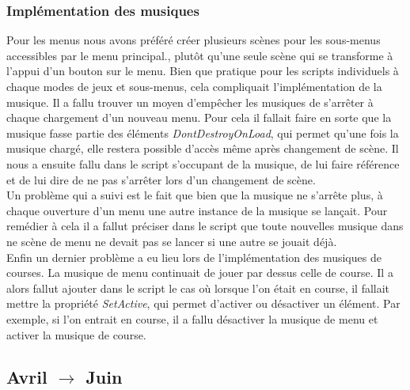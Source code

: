 \documentclass[a4paper,12pt]{article}
\begin{document}
            \subsubsection{Implémentation des musiques}
                Pour les menus nous avons préféré créer plusieurs scènes pour les sous-menus accessibles
                par le menu principal., plutôt qu'une seule scène qui se transforme à l'appui d'un 
                bouton sur le menu.
                Bien que pratique pour les scripts individuels à chaque modes de jeux et sous-menus,
                cela compliquait l'implémentation de la musique. Il a fallu trouver un moyen d'empêcher
                les musiques de s'arrêter à chaque chargement d'un nouveau menu. Pour cela il
                fallait faire en sorte que la musique fasse partie des éléments
                \textit{DontDestroyOnLoad}, qui permet qu'une fois la musique chargé, elle restera 
                possible d'accès
                même après changement de scène. Il nous a ensuite fallu dans le script s'occupant de la 
                musique, de lui faire référence et de lui dire de ne pas s'arrêter lors d'un changement
                de scène.\\
                Un problème qui a suivi est le fait que bien que la musique ne s'arrête plus, à chaque
                ouverture d'un menu une autre instance de la musique se lançait. Pour remédier à cela il
                a fallut préciser dans le script que toute nouvelles musique dans ne scène de menu ne
                devait pas se lancer si une autre se jouait déjà.\\
                Enfin un dernier problème a eu lieu lors de l'implémentation des musiques de courses. La
                musique de menu continuait de jouer par dessus celle de course. Il a alors fallut
                ajouter dans le script le cas où lorsque l'on était en course, il fallait mettre la 
                propriété \textit{SetActive}, qui permet d'activer ou désactiver un élément. Par 
                exemple, si l'on entrait en course, il a fallu désactiver la musique de menu et activer 
                la musique de course.
        
        
        \subsection{Avril $\to$ Juin}
    
\end{document}

